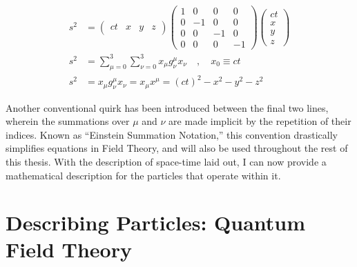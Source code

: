     \begin{equation} \begin{split}
        s^2 &= \begin{pmatrix} ct & x & y & z\end{pmatrix} 
            \begin{pmatrix}
                1 &  0 &  0 &  0 \\
                0 & -1 &  0 &  0 \\
                0 &  0 & -1 &  0 \\
                0 &  0 &  0 & -1
            \end{pmatrix}
            \begin{pmatrix} ct \\ x \\ y \\ z \end{pmatrix} \\
        s^2 &= \sum\limits_{\mu=0}^3 \sum\limits_{\nu=0}^3 x_\mu g^\mu_\nu x_\nu
            \quad , \quad x_0 \equiv ct \\
        s^2 &= x_\mu g^\mu_\nu x_\nu = x_\mu x^\mu = (ct)^2-x^2-y^2-z^2
    \end{split} \end{equation}

    Another conventional quirk has been introduced between the final two lines,
        wherein the summations over $\mu$ and $\nu$ are made implicit by the repetition of their indices.
    Known as ``Einstein Summation Notation,'' this convention drastically simplifies equations in Field Theory,
        and will also be used throughout the rest of this thesis.
    With the description of space-time laid out,
        I can now provide a mathematical description for the particles that operate within it.


\section{Describing Particles: Quantum Field Theory}

